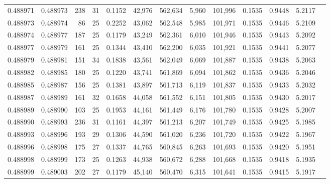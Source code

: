 \begin{tabular}{rrrrrrrrrrrrr}
0.488971 & 0.488973 & 238 &  31 &                                     0.1152 &  42,976 & 562,634 &   5,960 & 101,996 & 0.1535 & 0.9448 & 5.2117 \\
0.488973 & 0.488974 &  86 &  25 &                                     0.2252 &  43,062 & 562,548 &   5,985 & 101,971 & 0.1535 & 0.9446 & 5.2109 \\
0.488974 & 0.488977 & 187 &  25 &                                     0.1179 &  43,249 & 562,361 &   6,010 & 101,946 & 0.1535 & 0.9443 & 5.2092 \\
0.488977 & 0.488979 & 161 &  25 &                                     0.1344 &  43,410 & 562,200 &   6,035 & 101,921 & 0.1535 & 0.9441 & 5.2077 \\
0.488979 & 0.488981 & 151 &  34 &                                     0.1838 &  43,561 & 562,049 &   6,069 & 101,887 & 0.1535 & 0.9438 & 5.2063 \\
0.488982 & 0.488985 & 180 &  25 &                                     0.1220 &  43,741 & 561,869 &   6,094 & 101,862 & 0.1535 & 0.9436 & 5.2046 \\
0.488985 & 0.488987 & 156 &  25 &                                     0.1381 &  43,897 & 561,713 &   6,119 & 101,837 & 0.1535 & 0.9433 & 5.2032 \\
0.488987 & 0.488989 & 161 &  32 &                                     0.1658 &  44,058 & 561,552 &   6,151 & 101,805 & 0.1535 & 0.9430 & 5.2017 \\
0.488989 & 0.488990 & 103 &  25 &                                     0.1953 &  44,161 & 561,449 &   6,176 & 101,780 & 0.1535 & 0.9428 & 5.2007 \\
0.488990 & 0.488993 & 236 &  31 &                                     0.1161 &  44,397 & 561,213 &   6,207 & 101,749 & 0.1535 & 0.9425 & 5.1985 \\
0.488993 & 0.488996 & 193 &  29 &                                     0.1306 &  44,590 & 561,020 &   6,236 & 101,720 & 0.1535 & 0.9422 & 5.1967 \\
0.488996 & 0.488998 & 175 &  27 &                                     0.1337 &  44,765 & 560,845 &   6,263 & 101,693 & 0.1535 & 0.9420 & 5.1951 \\
0.488998 & 0.488999 & 173 &  25 &                                     0.1263 &  44,938 & 560,672 &   6,288 & 101,668 & 0.1535 & 0.9418 & 5.1935 \\
0.488999 & 0.489003 & 202 &  27 &                                     0.1179 &  45,140 & 560,470 &   6,315 & 101,641 & 0.1535 & 0.9415 & 5.1917 \\

\end{tabular}
